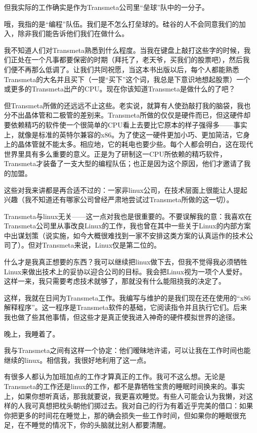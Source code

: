 但我实际的工作确实是作为Transmeta公司里“垒球”队中的一分子。

哦，我指的是“编程”队伍。我们是不怎么打垒球的。硅谷的人不会同意我们的加入，除非我们能告诉他们我们在做什么。

我不知道人们对Transmeta熟悉到什么程度。当我在键盘上敲打这些字的时候，我们正处在一个凡事都要保密的时期（拜托了，老天爷，买我们的股票吧），然后我们便不再那么低调了。让我们共同祝愿，当这本书出版以后，每个人都能熟悉Transmeta的大名并且买下（一提“买下”这个词，我总是下意识地想起股票）一个或更多的Transmeta出产的CPU。现在你该知道Transmeta是做什么的了吧？

但Transmeta所做的还远远不止这些。老实说，就算有人使劲敲打我的脑袋，我也分不出晶体管和二极管的差别来。Transmeta所做的仅仅是硬件而已，但这硬件却要依赖精巧的软件使一个很简单的CPU看上去要比它原本的样子强得多——事实上，就像是标准的英特尔兼容的x86。为了使这一硬件更加小巧、更加简洁，它身上的晶体管就不能太多。相应地，它的耗电也要少些。每个人都会明白，这在现代世界里具有多么重要的意义。正是为了研制这一CPU所依赖的精巧软件，Transmeta才装备了一支大型的编程队伍；也正是因为这个原因，他们才邀请了我的加盟。

这些对我来讲都是再合适不过的：一家非linux公司，在技术层面上很能让人提起兴趣（我不知道还有哪家公司曾经严肃地尝试过Transmeta所做的这一切）。

Transmeta与linux无关——这一点对我也是很重要的。不要误解我的意：我喜欢在Transmeta公司里从事改良Linux的工作，我也曾在其中一些关于Linux的内部方案中出谋划策（说实施，如今大概很难找到一家不安排这类方案的认真运作的技术公司了）。但对Transmeta来说，Linux仅是第二位的。

什么才是我真正想要的东西？我可以继续把linux做下去，但我不觉得我必须牺牲Linux来做出技术上的妥协以迎合公司的目标。我会把Linux视为一项个人爱好。这样一来，我只需要考虑技术就够了，那就没有什么能阻挠我的决定了。

这样，我就在日间为Transmeta工作。我编写与维护的是我们现在还在使用的“x86解释程序”。这一程序是Transmeta软件的基础，它阅读指令并且执行它们。后来我也做了些其他事情，但这些才是真正使我进入神奇的硬件模拟世界的途径。

晚上，我睡着了。

我与Transmeta之间有这样一个协定：他们暧昧地许诺，可以让我在工作时间也能继续的linux。相信我，我很好地利用了这一点。

有很多人都认为加班加点的工作才算真正的工作。我可不这么想。无论是Transmeta的工作还是linux的工作，都不是靠牺牲宝贵的睡眠时间换来的。事实上，如果你想听真话，那我就要说，我更喜欢睡觉。有些人可能会认为我懒，对这样的人我可真想把枕头朝他们掷过去。我对自己的行为有着近乎完美的借口：如果你把更多的时间花在睡觉上，那的确会损失一些工作时间，但如果你的睡眠很充足，在不睡觉的情况下，你的头脑就比别人都要清醒。

